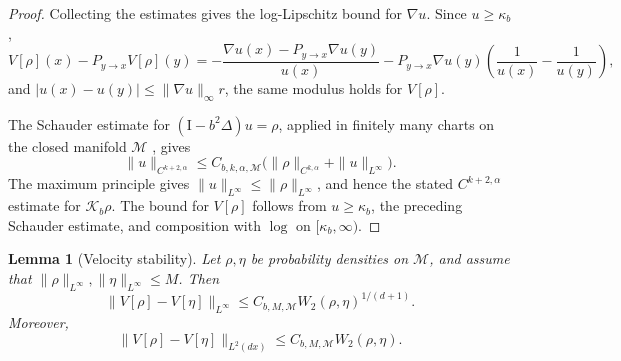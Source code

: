 \documentclass[11pt]{article}
\newtheorem{lemma}[theorem]{Lemma}
\theoremstyle{definition}
\def\Kb{\mathcal K_b}
\def\M{\mathcal M}
\def\I{\mathrm{I}}
\begin{document}
\begin{proof}
Collecting the estimates gives the log-Lipschitz
bound for \(\nabla u\). Since
\(u\ge\kappa_b\),
\[
V[\rho](x)-P_{y\to x}V[\rho](y)
=-\frac{\nabla u(x)-P_{y\to x}\nabla u(y)}{u(x)}
-P_{y\to x}\nabla u(y)\left(\frac1{u(x)}-\frac1{u(y)}\right),
\]
and \(|u(x)-u(y)|\le\|\nabla u\|_\infty r\), the same modulus holds for
\(V[\rho]\).

The Schauder estimate for \((\I-b^2\Delta)u=\rho\), applied in finitely many
charts on the  closed manifold \(\M\) \cite[Theorem~6.2 and Problem~6.1(a)]{gilbarg_trudinger_2001},
gives
\[
\|u\|_{C^{k+2,\alpha}}
\le C_{b,k,\alpha,\M}\bigl(\|\rho\|_{C^{k,\alpha}}+\|u\|_{L^\infty}\bigr).
\]
The maximum principle gives \(\|u\|_{L^\infty}\le\|\rho\|_{L^\infty}\), and hence
the stated \(C^{k+2,\alpha}\) estimate for \(\Kb\rho\). The bound for
\(V[\rho]\) follows from \(u\ge\kappa_b\), the preceding Schauder estimate, and
composition with \(\log\) on \([\kappa_b,\infty)\).
\end{proof}


\begin{lemma}[Velocity stability]\label{lem:wellposed_velocity_stability}\label{lem:wellposed_velocity_stability_l2}
Let \(\rho,\eta\) be probability densities on  \(\M\), and assume
that \(\|\rho\|_{L^\infty},\|\eta\|_{L^\infty}\leq M\). Then
\[
\|V[\rho]-V[\eta]\|_{L^\infty}
\le C_{b,M,\M} W_2(\rho,\eta)^{ 1/(d+1)}.
\]
Moreover, 
\[
\|V[\rho]-V[\eta]\|_{L^2(dx)}
\le C_{b,M,\M}W_2(\rho,\eta).
\]
\end{lemma}
\end{document}
